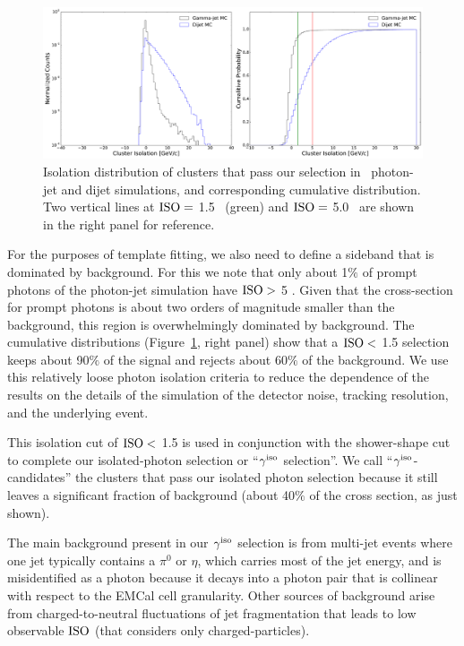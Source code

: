 \begin{figure}[h]
\center
\includegraphics[width=1.0\textwidth]{Purity/Isolation_MC_pPb.pdf}
\caption{Isolation distribution of clusters that pass our selection in \pPb~photon-jet and dijet simulations, and corresponding cumulative distribution. Two vertical lines at $\mathrm{ISO}=$ 1.5 \GeVc~(green) and $\mathrm{ISO}=$ 5.0 \GeVc~are shown in the right panel for reference.}
\label{MC_Isolation}
\end{figure}

For the purposes of template fitting, we also need to define a sideband that is dominated by background. For this we note that only about 1$\%$ of prompt photons of the photon-jet simulation have {$\mathrm{ISO}>$ 5 \GeVc}. Given that the cross-section for prompt photons is about two orders of magnitude smaller than the background, this region is overwhelmingly dominated by background.   
The cumulative distributions (Figure~\ref{MC_Isolation}, right panel) show that a {$\mathrm{ISO}<$ 1.5 \GeVc} selection keeps about 90$\%$ of the signal and rejects about 60$\%$ of the background. We use this relatively loose photon isolation criteria to reduce the dependence of the results on the details of the simulation of the detector noise, tracking resolution, and the underlying event. 

This isolation cut of {$\mathrm{ISO}<$ 1.5 \GeVc} is used in conjunction with the shower-shape cut to complete our isolated-photon selection or ``$\gamma^\mathrm{iso}$ selection''. We call ``$\gamma^\mathrm{iso}$-candidates'' the clusters that pass our isolated photon selection because it still leaves a significant fraction of background (about 40$\%$ of the cross section, as just shown). 

The main background present in our $\gamma^\mathrm{iso}$ selection is from multi-jet events where one jet typically contains a $\pi^{0}$ or $\eta$, which carries most of the jet energy, and is misidentified  as a photon because it decays into a photon pair that is collinear with respect to the EMCal cell granularity. Other sources of background arise from charged-to-neutral fluctuations of jet fragmentation that leads to low observable $\mathrm{ISO}$ (that considers only charged-particles). 

